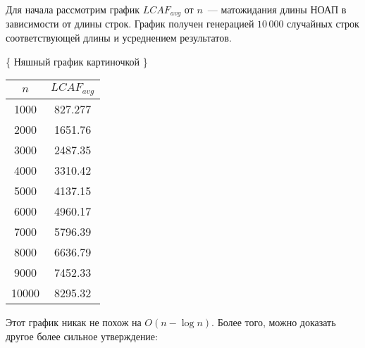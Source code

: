 Для начала рассмотрим график $LCAF_{avg}$ от $n$~--- матожидания длины НОАП в зависимости от длины строк. График получен генерацией $10\,000$ случайных строк соответствующей длины и усреднением результатов.

\{ Няшный график картиночкой \}

\begin{tabular}{|c|c|}
\hline
$n$ & $LCAF_{avg}$ \\
\hline
1000 & 827.277 \\
2000 & 1651.76 \\
3000 & 2487.35 \\
4000 & 3310.42 \\
5000 & 4137.15 \\
6000 & 4960.17 \\
7000 & 5796.39 \\
8000 & 6636.79 \\
9000 & 7452.33 \\
10000 & 8295.32 \\
\hline
\end{tabular}

Этот график никак не похож на $O(n - \log n)$. Более того, можно доказать другое более сильное утверждение:

